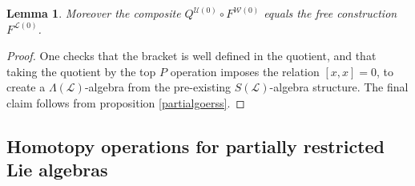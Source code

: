 \documentclass[11pt]{amsart}
\theoremstyle{plain}
\newtheorem{lem}[thm]{Lemma}
\theoremstyle{definition}
\newcommand{\scrL}{\mathscr{L}}
\newcommand{\calU}{\mathcal{U}}
\newcommand{\calL}{\mathcal{L}}
\newcommand{\calw}{\mathcal{W}}
\theoremstyle{plain}
\newcommand{\LieOperad}{{\scrL}}
\begin{document}
\begin{Constructing (co)homotopy operations}
\begin{lem}
Moreover the composite $Q^{\calU(0)}\circ F^{\calw(0)}$ equals the free construction $F^{\calL(0)}$.
\end{lem}
\begin{proof}
One checks that the bracket is well defined in the quotient, and that taking the quotient by the top $P$ operation imposes the relation $[x,x]=0$, to create a $\Lambda(\LieOperad)$-algebra from the pre-existing $S(\LieOperad)$-algebra structure. The final claim follows from proposition \ref{partialgoerss}.
\end{proof}


\end{Constructing (co)homotopy operations}






\begin{homotopy operations for PRLs}

\section{\textbf{Homotopy operations for partially restricted Lie algebras}}\label{sec on Lie algs and homotopy ops}


\end{homotopy operations for PRLs}
\end{document}
